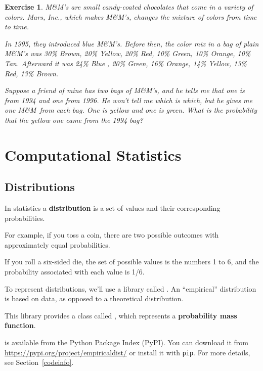 \documentclass[12pt]{book}
\theoremstyle{exercise}
\newtheorem{exercise}{Exercise}[chapter]
\begin{document}
\newcommand{\MM}{M\&M}

\begin{exercise}

\MM's are small candy-coated chocolates that come in a variety of
colors.  Mars, Inc., which makes \MM's, changes the mixture of
colors from time to time.

In 1995, they introduced blue \MM's.  Before then, the color mix in
a bag of plain \MM's was 30\% Brown, 20\% Yellow, 20\% Red, 10\%
Green, 10\% Orange, 10\% Tan.  Afterward it was 24\% Blue , 20\%
Green, 16\% Orange, 14\% Yellow, 13\% Red, 13\% Brown.

Suppose a friend of mine has two bags of \MM's, and he tells me
that one is from 1994 and one from 1996.  He won't tell me which is
which, but he gives me one \MM~from each bag.  One is yellow and
one is green.  What is the probability that the yellow one came
from the 1994 bag?

\end{exercise}


\chapter{Computational Statistics}
\label{compstat}

\section{Distributions}
\label{distributions}

In statistics a {\bf distribution} is a set of values and their
corresponding probabilities.

For example, if you toss a coin, there are two possible outcomes with approximately equal probabilities.

If you roll a six-sided die, the set of possible
values is the numbers 1 to 6, and the probability associated
with each value is 1/6.

To represent distributions, we'll use a library called .
An ``empirical'' distribution is based on data, as opposed to a theoretical distribution.

This library provides a class called , which represents
a {\bf probability mass function}.


 is available from the Python Package Index (PyPI).
You can download it from \url{https://pypi.org/project/empiricaldist/} or install it with {\tt pip}.
For more details, see Section~\ref{codeinfo}.
\end{document}
